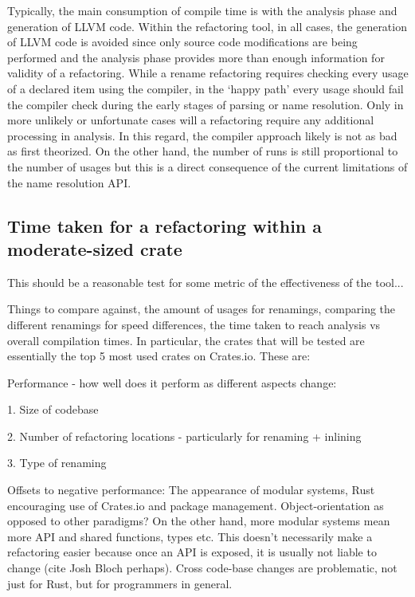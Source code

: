 Typically, the main consumption of compile time is with the analysis phase and generation of LLVM code. Within the refactoring tool, in all cases, the generation of LLVM code is avoided since only source code modifications are being performed and the analysis phase provides more than enough information for validity of a refactoring. While a rename refactoring requires checking every usage of a declared item using the compiler, in the `happy path' every usage should fail the compiler check during the early stages of parsing or name resolution. Only in more unlikely or unfortunate cases will a refactoring require any additional processing in analysis. In this regard, the compiler approach likely is not as bad as first theorized. On the other hand, the number of runs is still proportional to the number of usages but this is a direct consequence of the current limitations of the name resolution API.

\subsection{Time taken for a refactoring within a moderate-sized crate}
This should be a reasonable test for some metric of the effectiveness of the tool...

Things to compare against, the amount of usages for renamings, comparing the different renamings for speed differences, the time taken to reach analysis vs overall compilation times. 
In particular, the crates that will be tested are essentially the top 5 most used crates on Crates.io. These are: 



Performance - how well does it perform as different aspects change:

1. Size of codebase

2. Number of refactoring locations - particularly for renaming + inlining

3. Type of renaming

Offsets to negative performance:
The appearance of modular systems, Rust encouraging use of Crates.io and package management. Object-orientation as opposed to other paradigms? On the other hand, more modular systems mean more API and shared functions, types etc. This doesn't necessarily make a refactoring easier because once an API is exposed, it is usually not liable to change (cite Josh Bloch perhaps). Cross code-base changes are problematic, not just for Rust, but for programmers in general.

